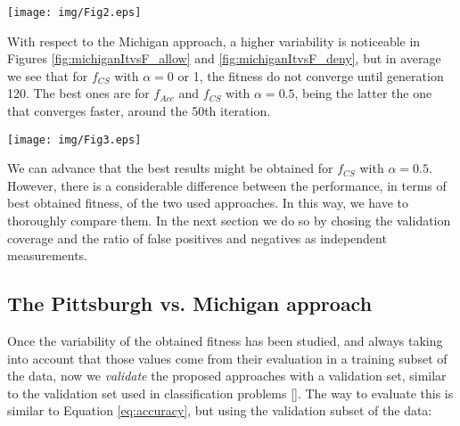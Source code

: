\begin{figure*}[h!tb]
	\centering
	\texttt{[image: img/Fig2.eps]}
	\caption{Convergence of fitness for each one of the tested fitness functions, and for Michigan approach being executed for the GRANTED class. Note that $f_{Acc}$ has to be maximised, whereas $f_{CS}$ has to be minimised.}
	\label{fig:michiganItvsF_allow}
\end{figure*}

With respect to the Michigan approach, a higher variability is noticeable in Figures \ref{fig:michiganItvsF_allow} and \ref{fig:michiganItvsF_deny}, but in average we see that for $f_{CS}$ with $\alpha = 0$ or 1, the fitness do not converge until generation 120. The best ones are for $f_{Acc}$ and $f_{CS}$ with $\alpha = 0.5$, being the latter the one that converges faster, around the 50th iteration.

\begin{figure*}[h!tb]
	\centering
	\texttt{[image: img/Fig3.eps]}
	\caption{Convergence of fitness for each one of the tested fitness functions, and for Michigan approach being executed for the STRONGDENY class. Note that $f_{Acc}$ has to be maximised, whereas $f_{CS}$ has to be minimised.}
	\label{fig:michiganItvsF_deny}
\end{figure*}

We can advance that the best results might be obtained for $f_{CS}$
with $\alpha = 0.5$. However, there is a considerable difference between the performance, in terms of best
obtained fitness, of the two used approaches. In this way, we have to thoroughly compare them. In the next section we do so by chosing the validation coverage and the ratio of false positives and negatives as independent measurements. 

\subsection{The Pittsburgh vs. Michigan approach} 
\label{subsec:approachcomparison}

Once the variability of the obtained fitness has been studied, and
always taking into account that those values come from their
evaluation in a training subset of the data, now we \textit{validate}
the proposed approaches with a validation set, similar to the validation set used in classification problems [\cite{witten2005data}]. 
 The way to evaluate this is similar to Equation \ref{eq:accuracy}, but using the validation subset of the data:

